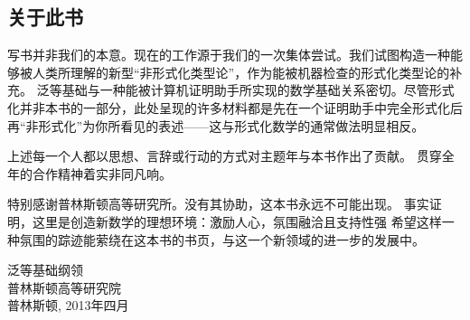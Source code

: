 \subsection*{关于此书}

写书并非我们的本意。现在的工作源于我们的一次集体尝试。我们试图构造一种能够被人类所理解的新型“非形式化类型论”，作为能被机器检查的形式化类型论的补充。
泛等基础与一种能被计算机证明助手所实现的数学基础关系密切。尽管形式化并非本书的一部分，此处呈现的许多材料都是先在一个证明助手中完全形式化后
再“非形式化”为你所看见的表述——这与形式化数学的通常做法明显相反。

上述每一个人都以思想、言辞或行动的方式对主题年与本书作出了贡献。
贯穿全年的合作精神着实非同凡响。

\mentalpause

特别感谢普林斯顿高等研究所。没有其协助，这本书永远不可能出现。
事实证明，这里是创造新数学的理想环境：激励人心，氛围融洽且支持性强
希望这样一种氛围的踪迹能萦绕在这本书的书页，与这一个新领域的进一步的发展中。

\bigskip

\begin{flushright}
泛等基础纲领\\
普林斯顿高等研究院\\
普林斯顿, 2013年四月
\end{flushright}

